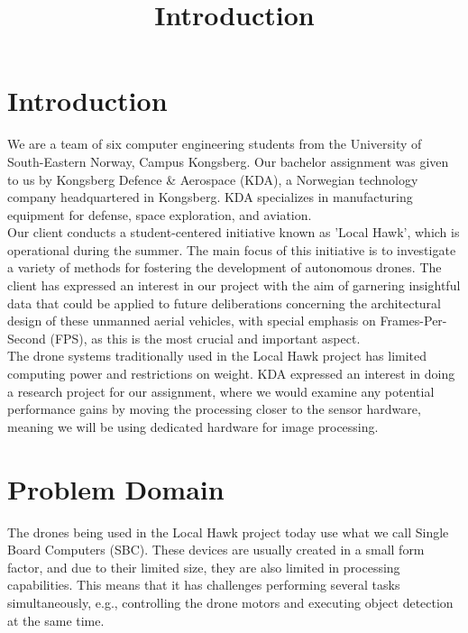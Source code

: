 
\title{Introduction}




\section{Introduction}

We are a team of six computer engineering students from the University of South-Eastern Norway, Campus Kongsberg. Our bachelor assignment was given to us by Kongsberg Defence \& Aerospace (KDA), a Norwegian technology company headquartered in Kongsberg. KDA specializes in manufacturing equipment for defense, space exploration, and aviation.\cite{KongsbergGruppen}\\

Our client conducts a student-centered initiative known as 'Local Hawk', which is operational during the summer. The main focus of this initiative is to investigate a variety of methods for fostering the development of autonomous drones. The client has expressed an interest in our project with the aim of garnering insightful data that could be applied to future deliberations concerning the architectural design of these unmanned aerial vehicles, with special emphasis on Frames-Per-Second (FPS), as this is the most crucial and important aspect.\\


The drone systems traditionally used in the Local Hawk project has limited computing power and restrictions on weight. KDA expressed an interest in doing a research project for our assignment, where we would examine any potential performance gains by moving the processing closer to the sensor hardware, meaning we will be using dedicated hardware for image processing.\\

\section{Problem Domain}

The drones being used in the Local Hawk project today use what we call Single Board
Computers (SBC). These devices are usually created in a small form factor, and due to their limited size, they are also limited in processing capabilities. This means that it has challenges performing several tasks simultaneously, e.g., controlling the drone motors and executing object detection at the same time. \\

